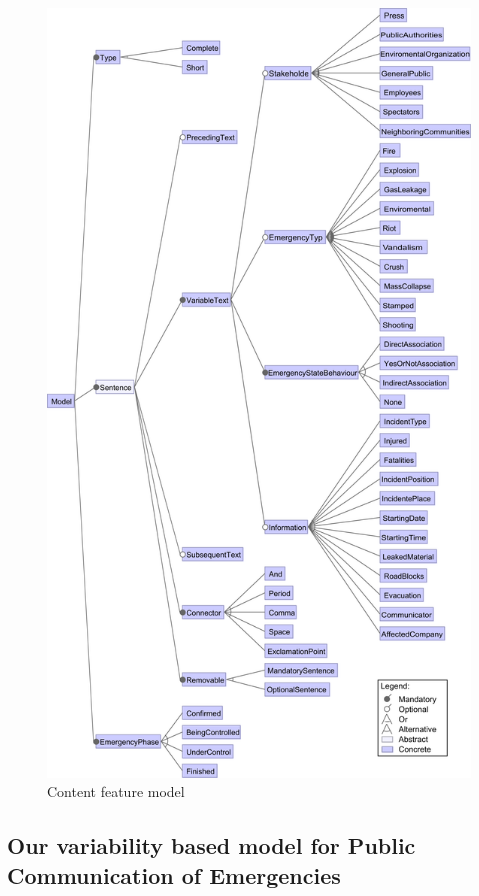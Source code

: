 \begin{figure}[]
\begin{center}
  \includegraphics[width=\linewidth]{images/FMModel}
\caption{Content feature model}
\label{fig:FMModel}
\end{center}
\end{figure}

\subsection{Our variability based model for Public Communication of Emergencies}

